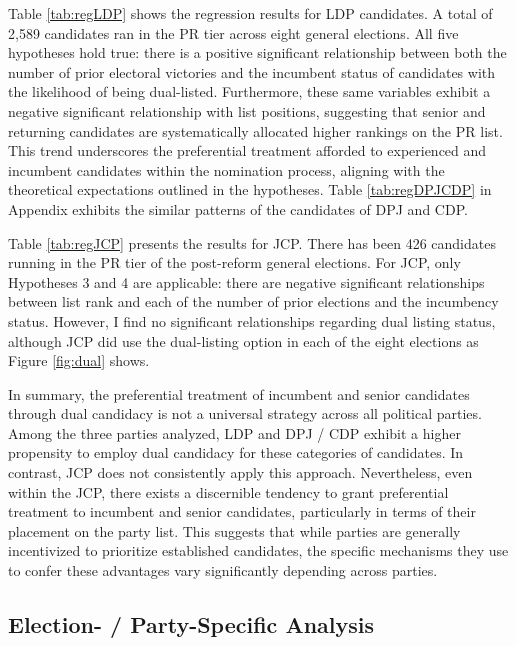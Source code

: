 \documentclass[a4paper, 11pt]{article}
\begin{document}
Table \ref{tab:regLDP} shows the regression results for LDP candidates. A total of 2,589 candidates ran in the PR tier across eight general elections. All five hypotheses hold true: there is a positive significant relationship between both the number of prior electoral victories and the incumbent status of candidates with the likelihood of being dual-listed. Furthermore, these same variables exhibit a negative significant relationship with list positions, suggesting that senior and returning candidates are systematically allocated higher rankings on the PR list. This trend underscores the preferential treatment afforded to experienced and incumbent candidates within the nomination process, aligning with the theoretical expectations outlined in the hypotheses. Table \ref{tab:regDPJCDP} in Appendix exhibits the similar patterns of the candidates of DPJ and CDP. 



Table \ref{tab:regJCP} presents the results for JCP. There has been 426 candidates running in the PR tier of the post-reform general elections. For JCP, only Hypotheses 3 and 4 are applicable: there are negative significant relationships between list rank and each of the number of prior elections and the incumbency status. However, I find no significant relationships regarding dual listing status, although JCP did use the dual-listing option in each of the eight elections as Figure \ref{fig:dual} shows. 



In summary, the preferential treatment of incumbent and senior candidates through dual candidacy is not a universal strategy across all political parties. Among the three parties analyzed, LDP and DPJ / CDP exhibit a higher propensity to employ dual candidacy for these categories of candidates. In contrast, JCP does not consistently apply this approach. Nevertheless, even within the JCP, there exists a discernible tendency to grant preferential treatment to incumbent and senior candidates, particularly in terms of their placement on the party list. This suggests that while parties are generally incentivized to prioritize established candidates, the specific mechanisms they use to confer these advantages vary significantly depending across parties. 

\subsection{Election- / Party-Specific Analysis}
\end{document}
